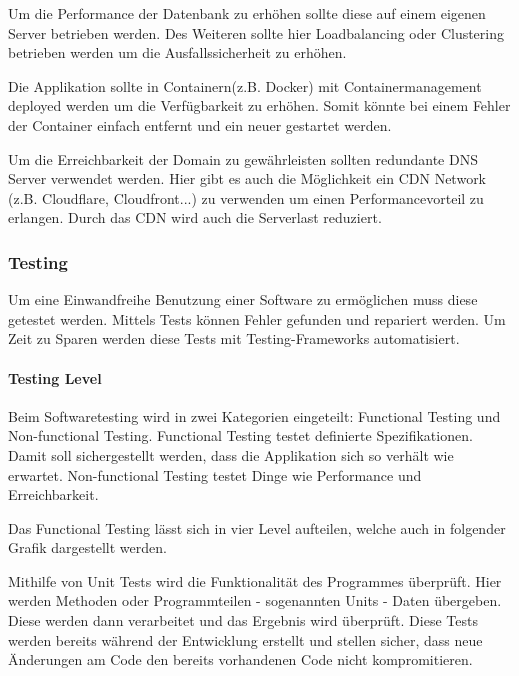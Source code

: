 Um die Performance der Datenbank zu erhöhen sollte diese auf einem eigenen Server betrieben werden. Des Weiteren sollte hier Loadbalancing oder Clustering betrieben werden um die Ausfallssicherheit zu erhöhen. 

Die Applikation sollte in Containern(z.B. Docker) mit Containermanagement deployed werden um die Verfügbarkeit zu erhöhen. Somit könnte bei einem Fehler der Container einfach entfernt und ein neuer gestartet werden. 

Um die Erreichbarkeit der Domain zu gewährleisten sollten redundante DNS Server verwendet werden. Hier gibt es auch die Möglichkeit ein CDN Network (z.B. Cloudflare, Cloudfront...) zu verwenden um einen Performancevorteil zu erlangen. Durch das CDN wird auch die Serverlast reduziert.

\newpage

\subsubsection{Testing}
Um eine Einwandfreihe Benutzung einer Software zu ermöglichen muss diese getestet werden. Mittels Tests können Fehler gefunden und repariert werden. Um Zeit zu Sparen werden diese Tests mit Testing-Frameworks automatisiert.

\paragraph{Testing Level}
Beim Softwaretesting wird in zwei Kategorien eingeteilt: Functional Testing und Non-functional Testing. Functional Testing testet definierte Spezifikationen. Damit soll sichergestellt werden, dass die Applikation sich so verhält wie erwartet. Non-functional Testing testet Dinge wie Performance und Erreichbarkeit.\cite{TESTING1}

Das Functional Testing lässt sich in vier Level aufteilen, welche auch in folgender Grafik dargestellt werden.


Mithilfe von Unit Tests wird die Funktionalität des Programmes überprüft. Hier werden Methoden oder Programmteilen - sogenannten Units - Daten übergeben. Diese werden dann verarbeitet und das Ergebnis wird überprüft. Diese Tests werden bereits während der Entwicklung erstellt und stellen sicher, dass neue Änderungen am Code den bereits vorhandenen Code nicht kompromitieren. \cite{TESTING3}

